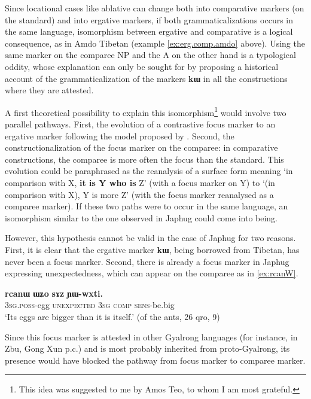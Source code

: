\documentclass[oldfontcommands,oneside,a4paper,11pt]{article}
\newcommand{\ipa}[1]{{\phon\textbf{#1}}}
\begin{document}
Since   locational cases like ablative can change both into comparative markers (on the standard) and  into ergative markers, if both grammaticalizations occurs in the same language, isomorphism between ergative and comparative is a logical consequence, as in Amdo Tibetan (example \ref{ex:erg.comp.amdo} above).
Using the same marker on the comparee NP and the A on the other hand is a typological oddity, whose explanation can only be sought for by proposing a historical account of the grammaticalization of the markers \ipa{kɯ} in all the constructions where they are attested.

A first theoretical possibility to explain this isomorphism\footnote{This idea was suggested to me by Amos Teo, to whom I am most grateful.} would involve two parallel pathways. First, the evolution of a contrastive focus marker to an ergative marker following the model proposed by \citet{gaby10thaayorre.ergative}. Second, the constructionalization of the focus marker on the comparee: in comparative constructions, the comparee is more often the focus than the standard. This evolution could be paraphrased as the reanalysis of a surface form meaning `in comparison with X, \textbf{it is Y who is}  Z' (with a focus marker on Y) to  `(in comparison with X), Y is more  Z' (with the focus marker reanalysed as a comparee marker). 
If these two paths were to occur in the same language, an isomorphism similar to the one observed in Japhug could come into being.

However, this hypothesis cannot be valid in the case of Japhug for two reasons. First, it is clear that the ergative marker \ipa{kɯ}, being borrowed from Tibetan, has never been a focus marker. Second,  there is already a focus marker in Japhug expressing unexpectedness, which can appear on the comparee as in \ref{ex:rcanW}.

\begin{exe}
\ex \label{ex:rcanW}
\gll   \ipa{ɯ-ŋgɯm} 	\ipa{rcanɯ} 	\ipa{ɯʑo} 	\ipa{sɤz} 	\ipa{ɲɯ-wxti.} 	 \\
\textsc{3sg.poss}-egg \textsc{unexpected} \textsc{3sg} \textsc{comp} \textsc{sens}-be.big \\
\glt `Its eggs are bigger than it is itself.' (of the ants, 26 qro, 9)
\end{exe}

Since this focus marker is attested in other Gyalrong languages (for instance, in Zbu, Gong Xun p.c.) and is most probably inherited from proto-Gyalrong, its presence would have blocked the pathway from focus marker to  comparee marker. 
\end{document}
